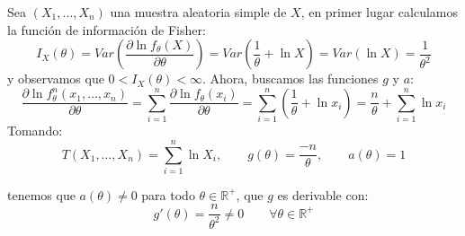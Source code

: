 \begin{ejercicio}
\begin{enumerate}[label=\alph*)]
            Sea $(X_1, \ldots, X_n)$ una muestra aleatoria simple de $X$, en primer lugar calculamos la función de información de Fisher:
            \begin{equation*}
                I_X(\theta) = Var\left(\dfrac{\partial \ln f_\theta(X)}{\partial \theta}\right) = Var\left(\frac{1}{\theta} + \ln X\right) = Var\left(\ln X\right) = \frac{1}{\theta^2}
            \end{equation*}
            y observamos que $0<I_X(\theta) < \infty$. Ahora, buscamos las funciones $g$ y $a$:
            \begin{equation*}
                \dfrac{\partial \ln f_\theta^n(x_1, \ldots, x_n)}{\partial \theta} = \sum_{i=1}^{n} \dfrac{\partial  \ln f_\theta(x_i)}{\partial \theta} = \sum_{i=1}^{n} \left(\frac{1}{\theta}+\ln x_i\right) = \frac{n}{\theta} + \sum_{i=1}^{n}\ln x_i 
            \end{equation*}
            Tomando:
            \begin{equation*}
                T(X_1, \ldots, X_n) = \sum_{i=1}^{n}\ln X_i, \qquad g(\theta) = \frac{-n}{\theta}, \qquad a(\theta) = 1
            \end{equation*}

            tenemos que $a(\theta)\neq 0$ para todo $\theta\in \mathbb{R}^+$, que $g$ es derivable con:
            \begin{equation*}
                g'(\theta) = \frac{n}{\theta^2} \neq 0 \qquad \forall \theta\in \mathbb{R}^+
            \end{equation*}


\end{enumerate}
\end{ejercicio}
